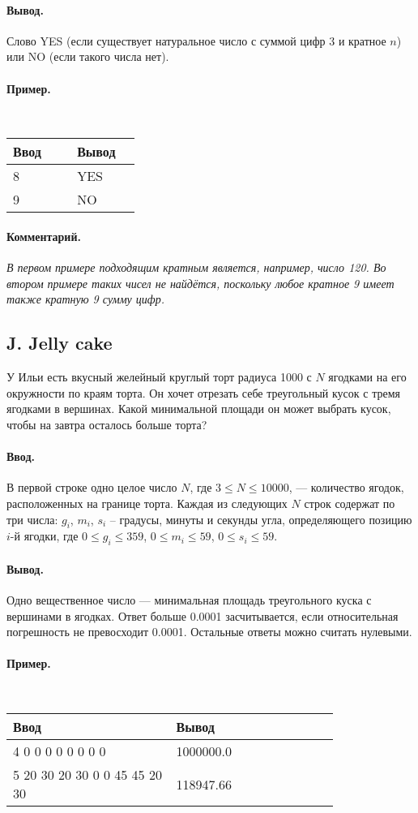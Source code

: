 \documentclass[12pt, a4paper]{article}
\newcommand{\informat}[1]
{
	\paragraph{Ввод.\\} #1
}
\newcommand{\outformat}[1]
{
	\paragraph{Вывод.\\} #1
}
\newcommand{\examplee}[4]
{
	\paragraph{Пример.\\}
	{\tt
	\begin{tabular}{|p{0.4\linewidth}|p{0.4\linewidth}|}
	\hline
	Ввод 	& Вывод  	\\
	\hline
	#1 		& #2 		\\
	\hline
	#3		& #4		\\
	\hline
	\end{tabular}
	}
}
\newcommand{\excomm}[1]
{
	\paragraph{Комментарий. \\}
	\textit{#1}
}
\begin{document}
\outformat{Слово YES (если существует натуральное число с суммой цифр 3 и кратное $n$) или NO (если такого числа нет).}

\examplee{8}{YES}{9}{NO}

\excomm{В первом примере подходящим кратным является, например, число 120. Во втором примере таких чисел не найдётся, поскольку любое кратное 9 имеет также кратную 9 сумму цифр.}



\subsection*{J. Jelly cake}

У Ильи есть вкусный желейный круглый торт радиуса 1000 с $N$ ягодками на его окружности по краям торта. Он хочет отрезать себе треугольный кусок с тремя ягодками в вершинах. Какой минимальной площади он может выбрать кусок, чтобы на завтра осталось больше торта?

\informat{В первой строке одно целое число $N$, где $3 \le N \le 10000$, --- количество ягодок, расположенных на границе торта. \newline Каждая из следующих $N$ строк содержат по три числа: $g_i$, $m_i$, $s_i$ -- градусы, минуты и секунды угла, определяющего позицию $i$-й ягодки, где $0 \le g_i \le 359$, $0 \le m_i \le 59$, $0 \le s_i \le 59$.}

\outformat{Одно вещественное число --- минимальная площадь треугольного куска с вершинами в ягодках. Ответ больше 0.0001 засчитывается, если относительная погрешность не превосходит 0.0001. Остальные ответы можно считать нулевыми.}

\examplee{4 \newline
0 0 0\newline
90 0 0\newline
180 0 0\newline
270 0 0}{1000000.0}
{5 \newline
180 20 30\newline
120 20 30\newline
0 0 0\newline
45 45 45\newline
90 20 30}{118947.66}
\end{document}
